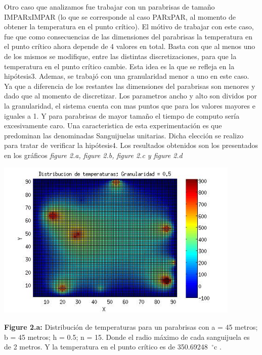 \documentclass[a4paper]{article}
\begin{document}

Otro caso que analizamos fue trabajar con un parabrisas de tamaño IMPARxIMPAR (lo que se corresponde al caso PARxPAR, al momento de obtener la temperatura en el punto crítico). El mótivo de trabajar con este caso, fue que como consecuencias de las dimensiones del parabrisas la temperatura en el punto crítico ahora depende de 4 valores en total. Basta con que al menos uno de los mismos se modifique, entre las distintas discretizaciones, para que la temperatura en el punto crítico cambie. Esta idea es la que se refleja en la hipótesis3.\newline
Ademas, se trabajó con una granularidad menor a uno en este caso. Ya que a diferencia de los restantes las dimensiones del parabrisas son menores y dado que al momento de discretizar. Los parametros ancho y alto son dividos por la granularidad, el sistema cuenta con mas puntos que para los valores mayores e iguales a 1. Y para parabrisas de mayor tamaño el tiempo de computo sería excesivamente caro.  
Una caracteristica de esta experimentación es que predominan las denominadas Sanguijuelas unitarias. Dicha elección se realizo para tratar de verificar la hipótesis4. Los resultados obtenidos son los presentados en los gráficos \textit{figure 2.a, figure 2.b, figure 2.c y figure 2.d}\newline


\includegraphics[width=\textwidth,height=3.0in,keepaspectratio
]{45x45h0,5.jpg} \newline
\begin {flushleft}
\textbf{Figure 2.a:} Distribución de temperaturas para un parabrisas con a = 45 metros; b = 45 metros; h = 0.5; n = 15. Donde el radio máximo de cada sanguijuela es de 2 metros. Y la temperatura en el punto crítico es de  350.69248\hspace{-1.5mm}$\phantom{a}^{\circ}$c .
\end{flushleft}
\end{document}
